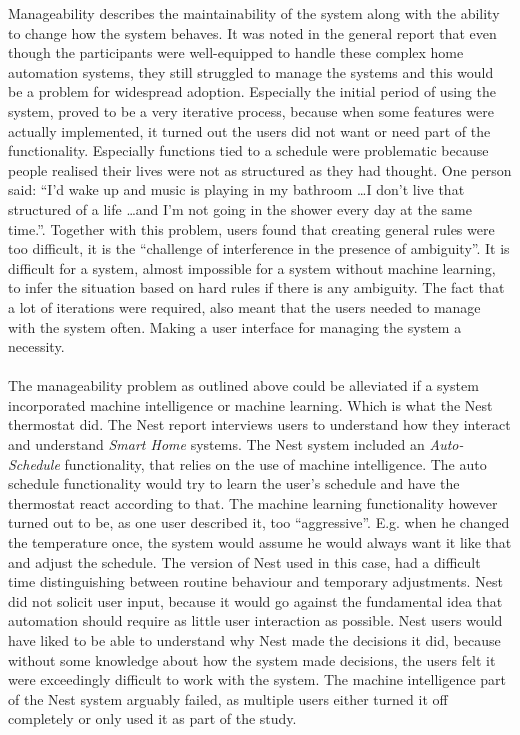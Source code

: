 Manageability describes the maintainability of the system along with the ability
to change how the system behaves. It was noted in the general report that even though the participants were well-equipped to handle these complex home automation systems, they still struggled to manage the systems and this would be a problem for widespread adoption. Especially the initial period of using the system, proved to be a very iterative process, because when some features were actually implemented, it turned out the users did not want or need part of the functionality. Especially functions tied to a schedule were problematic because people realised their lives were not as structured as they had thought. One person said: \enquote{I'd wake up and music is playing in my bathroom \ldots I don't live that structured of a life \ldots and I'm not going in the shower every day at the same time.}. Together with this problem, users found that creating general rules were too difficult, it is the \enquote{challenge of interference in the presence of ambiguity}\cite{HAInterviews}. It is difficult for a system, almost impossible for a system without machine learning, to infer the situation based on hard rules if there is any ambiguity. The fact that a lot of iterations were required, also meant that the users needed to manage with the system often. Making a user interface for managing the system a necessity.
\\\\
The manageability problem as outlined above could be alleviated if a system incorporated machine intelligence or machine learning. Which is what the Nest thermostat did. The Nest report interviews users to understand how they interact and understand \emph{Smart Home} systems. The Nest system included an \emph{Auto-Schedule} functionality, that relies on the use of machine intelligence. The auto schedule functionality would try to learn the user's schedule and have the thermostat react according to that. The machine learning functionality however turned out to be, as one user described it, too \enquote{aggressive}\cite{AdaptiveInterviews}. E.g. when he changed the temperature once, the system would assume he would always want it like that and adjust the schedule. The version of Nest used in this case, had a difficult time distinguishing between routine behaviour and temporary adjustments. Nest did not solicit user input, because it would go against the fundamental idea that automation should require as little user interaction as possible. Nest users would have liked to be able to understand why Nest made the decisions it did, because without some knowledge about how the system made decisions, the users felt it were exceedingly difficult to work with the system. The machine intelligence part of the Nest system arguably failed, as multiple users either turned it off completely or only used it as part of the study.
